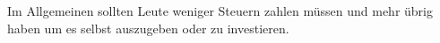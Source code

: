 Im Allgemeinen sollten Leute weniger Steuern zahlen müssen und mehr übrig haben um es selbst auszugeben oder zu investieren.